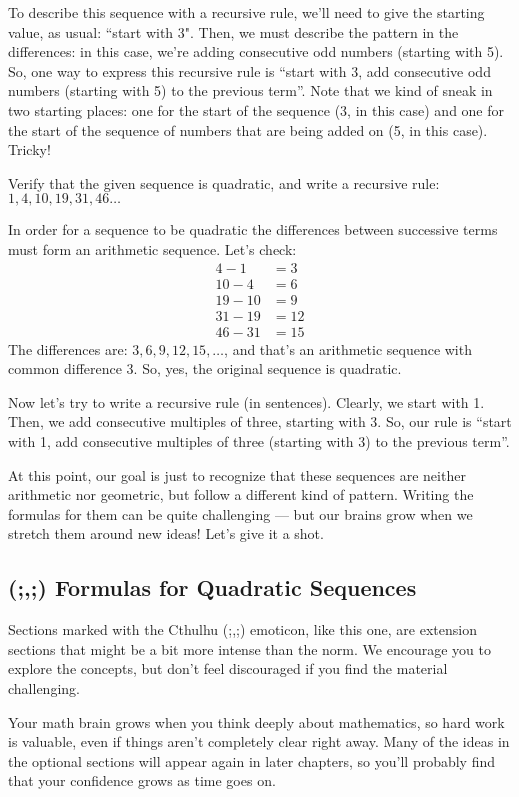 To describe this sequence with a recursive rule, we'll need to give the starting value, as usual: ``start with 3". Then, we must describe the pattern in the differences: in this case, we're adding consecutive odd numbers (starting with 5). So, one way to express this recursive rule is ``start with 3, add consecutive odd numbers (starting with 5) to the previous term''. Note that we kind of sneak in two starting places: one for the start of the sequence (3, in this case) and one for the start of the sequence of numbers that are being added on (5, in this case). Tricky!

\begin{boxedex}
Verify that the given sequence is quadratic, and write a recursive rule: $1, 4, 10, 19, 31,46\dotsc$

\exsoln{} In order for a sequence to be quadratic the differences between successive terms must form an arithmetic sequence. Let's check:
\[\begin{aligned}
4-1 &= 3\\
10-4 &= 6\\
19-10 &= 9\\
31-19 &= 12\\
46-31 &= 15
\end{aligned}\]
The differences are: $3, 6, 9, 12, 15,\dotsc$, and that's an arithmetic sequence with common difference 3. So, yes, the original sequence is quadratic.

Now let's try to write a recursive rule (in sentences). Clearly, we start with 1. Then, we add consecutive multiples of three, starting with 3. So, our rule is ``start with 1, add consecutive multiples of three (starting with 3) to the previous term''.
\end{boxedex}

At this point, our goal is just to recognize that these sequences are neither arithmetic nor geometric, but follow a different kind of pattern. Writing the formulas for them can be quite challenging --- but our brains grow when we stretch them around new ideas! Let's give it a shot.


\subsection{(;,;) Formulas for Quadratic Sequences}
%
\begin{tcolorbox}[title={Extension Sections}]
Sections marked with the Cthulhu (;,;) emoticon, like this one, are extension sections that might be a bit more intense than the norm. We encourage you to explore the concepts, but don't feel discouraged if you find the material challenging.

Your math brain grows when you think deeply about mathematics, so hard work is valuable, even if things aren't completely clear right away. Many of the ideas in the optional sections will appear again in later chapters, so you'll probably find that your confidence grows as time goes on.
\end{tcolorbox}

